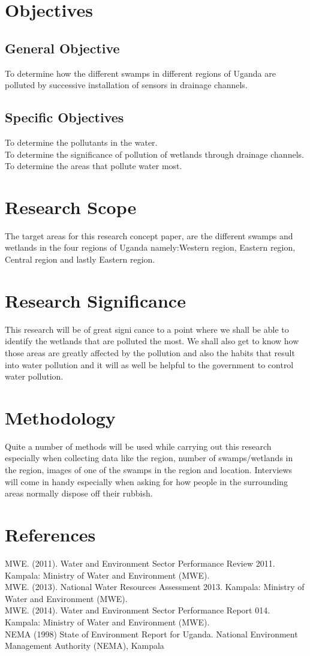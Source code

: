 \documentclass{article}
\begin{document}
\section{Objectives}
\subsection{General Objective}
To determine how the different swamps in different regions of Uganda are polluted by successive installation of sensors in drainage channels.
\subsection{Specific Objectives}
To determine the pollutants in the water.\\
To determine the significance of pollution of wetlands through drainage channels.\\
To determine the areas that pollute water most.\\
\section{Research Scope}
The target areas for this research concept paper, are the different swamps and wetlands in the four regions of Uganda namely:Western region, Eastern region, Central region and lastly Eastern region.
\section{Research Significance}
This research will be of great signicance to a point where we shall be able to identify the wetlands that are polluted the most. We shall also get to know how those areas are greatly affected by the pollution and also the habits that result into water pollution and it will as well be helpful to the government to control water pollution.
\section{Methodology}
Quite a number of methods will be used while carrying out this research especially when collecting data like the region, number of swamps/wetlands in the region, images of one of the swamps in the region and location. Interviews will come in handy especially when
asking for how people in the surrounding areas normally dispose off their rubbish.
\section{References}
MWE. (2011). Water and Environment Sector Performance Review
2011. Kampala: Ministry of Water and Environment (MWE).\\
MWE. (2013). National Water Resources Assessment 2013. Kampala:
Ministry of Water and Environment (MWE).\\
MWE. (2014). Water and Environment Sector Performance
Report 014. Kampala: Ministry of Water and Environment
(MWE).\\
NEMA (1998) State of Environment Report for Uganda. National Environment Management Authority (NEMA),
Kampala
\end{document}
